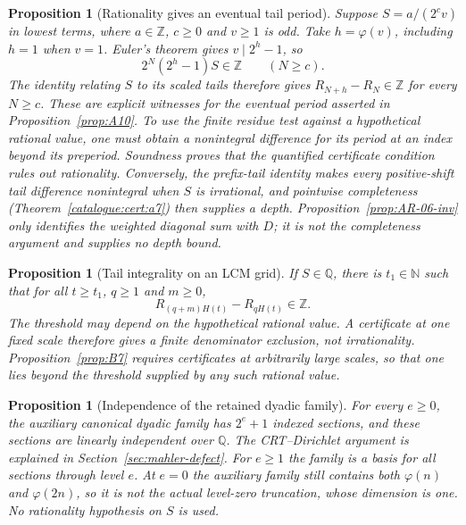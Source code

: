 \documentclass[11pt]{article}
\theoremstyle{plain}
\newtheorem{prop}[thm]{Proposition}
\theoremstyle{definition}
\theoremstyle{remark}
\begin{document}
\begin{prop}[Rationality gives an eventual tail period]\label{prop:A9-inv}
Suppose $S=a/(2^c v)$ in lowest terms, where $a\in\mathbb Z$,
$c\ge0$ and $v\ge1$ is odd. Take $h=\varphi(v)$, including
$h=1$ when $v=1$. Euler's theorem gives $v\mid2^h-1$, so
\[
 2^N(2^h-1)S\in\mathbb Z\qquad(N\ge c).
\]
The identity relating $S$ to its scaled tails therefore gives
$R_{N+h}-R_N\in\mathbb Z$ for every $N\ge c$.
These are explicit witnesses for the eventual period asserted in
Proposition~\ref{prop:A10}. To use the finite residue test against a
hypothetical rational value, one must obtain a nonintegral difference
for its period at an index beyond its preperiod. Soundness proves that
the quantified certificate condition rules out rationality. Conversely,
the prefix-tail identity makes every positive-shift tail difference
nonintegral when $S$ is irrational, and pointwise completeness
(Theorem~\ref{catalogue:cert:a7}) then supplies a depth.
Proposition~\ref{prop:AR-06-inv} only identifies the weighted diagonal
sum with $D$; it is not the completeness argument and supplies no
depth bound.
\end{prop}

\begin{prop}[Tail integrality on an LCM grid]\label{prop:B6-inv}
If $S\in\mathbb Q$, there is $t_1\in\mathbb N$ such that for all
$t\ge t_1$, $q\ge1$ and $m\ge0$,
\[
 R_{(q+m)H(t)}-R_{qH(t)}\in\mathbb Z.
\]
The threshold may depend on the hypothetical rational value. A
certificate at one fixed scale therefore gives a finite denominator
exclusion, not irrationality. Proposition~\ref{prop:B7} requires
certificates at arbitrarily large scales, so that one lies beyond the
threshold supplied by any such rational value.

\end{prop}

\begin{prop}[Independence of the retained dyadic family]\label{prop:D4-inv}
For every $e\ge0$, the auxiliary canonical dyadic family has
$2^e+1$ indexed sections, and these sections are linearly independent
over $\mathbb Q$. The CRT--Dirichlet argument is explained in
Section~\ref{sec:mahler-defect}. For $e\ge1$ the family is a basis for all sections through level
$e$. At $e=0$ the auxiliary family still contains both $\varphi(n)$ and
$\varphi(2n)$, so it is not the actual level-zero truncation, whose
dimension is one. No rationality hypothesis on $S$ is used.

\end{prop}
\end{document}
